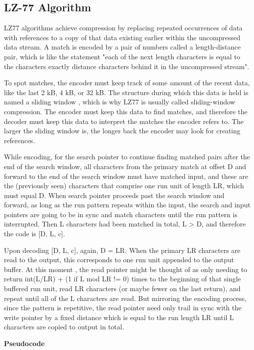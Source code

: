 \documentclass{article}
\begin{document}
\subsection{LZ-77 Algorithm}
LZ77 algorithms achieve compression by replacing repeated occurrences of data with references to a copy of that data existing earlier within the uncompressed data stream. A match is encoded by a pair of numbers called a length-distance pair, which is like the statement "each of the next length characters is equal to the characters exactly distance characters behind it in the uncompressed stream".

To spot matches, the encoder must keep track of some amount of the recent data, like the last 2 kB, 4 kB, or 32 kB. The structure during which this data is held is named a sliding window , which is why LZ77 is usually called sliding-window compression. The encoder must keep this data to find matches, and therefore the decoder must keep this data to interpret the matches the encoder refers to. The larger the sliding window is, the longer back the encoder may look for creating references.

While encoding, for the search pointer to continue finding matched pairs after the end of the search window, all characters from the primary match at offset D and forward to the end of the search window must have matched input, and these are the (previously seen) characters that comprise one run unit of length LR, which must equal D. When search pointer proceeds past the search window and forward, as long as the run pattern repeats within the input, the search and input pointers are going to be in sync and match characters until the run pattern is interrupted. Then L characters had been matched in total, L > D, and therefore the code is [D, L, c].

Upon decoding [D, L, c], again, D = LR. When the primary LR characters are read to the output, this corresponds to one run unit appended to the output buffer. At this moment , the read pointer might be thought of as only needing to return int(L/LR) + (1 if L mod LR != 0) times to the beginning of that single buffered run unit, read LR characters (or maybe fewer on the last return), and repeat until all of the L characters are read. But mirroring the encoding process, since the pattern is repetitive, the read pointer need only trail in sync with the write pointer by a fixed distance which is equal to the run length LR until L characters are copied to output in total.

\textbf{Pseudocode}
\end{document}
